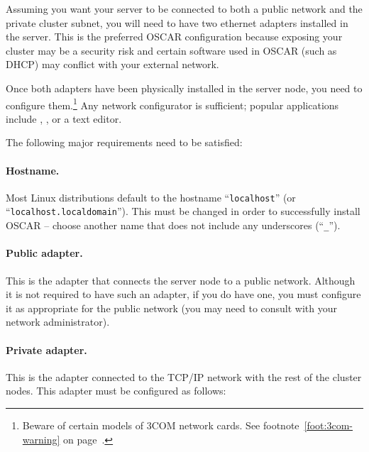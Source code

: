 Assuming you want your server to be connected to both a public
network and the private cluster subnet, you will need to have two
ethernet adapters installed in the server. This is the preferred OSCAR
configuration because exposing your cluster may be a security
risk and certain software used in OSCAR (such as DHCP) may conflict with
your external network.

Once both adapters have been physically installed in the server node,
you need to configure them.\footnote{Beware of certain models of 3COM
  network cards.  See footnote~\ref{foot:3com-warning} on
  page~\pageref{foot:3com-warning}.}  Any network configurator is
sufficient; popular applications include , , or
a text editor.

The following major requirements need to be satisfied:

\paragraph{Hostname.} Most Linux distributions default to the hostname
``{\tt localhost}'' (or ``{\tt localhost.localdomain}'').  This must
be changed in order to successfully install OSCAR -- choose another
name that does not include any underscores (``{\tt \_}'').

\paragraph{Public adapter.}  This is the adapter that connects the
server node to a public network.  Although it is not required to have
such an adapter, if you do have one, you must configure it as
appropriate for the public network (you may need to consult with your
network administrator).

\paragraph{Private adapter.}  This is the adapter connected to
the TCP/IP network with the rest of the cluster nodes.  This adapter
must be configured as follows:

